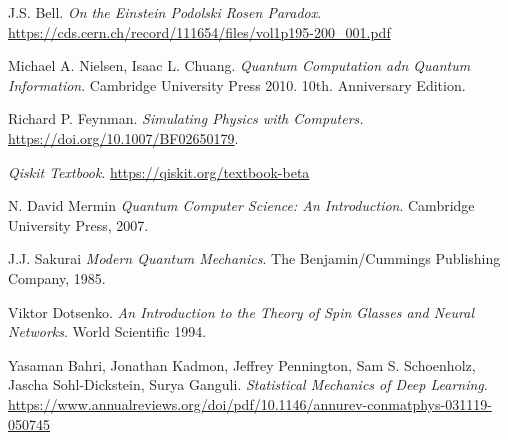 \documentclass[a4paper]{article}
\begin{document}
\begin{thebibliography}{99}

 J.S. Bell. \textit{On the Einstein Podolski Rosen Paradox}. \url{https://cds.cern.ch/record/111654/files/vol1p195-200_001.pdf}

 Michael A. Nielsen, Isaac L. Chuang. \textit{Quantum Computation adn Quantum Information}. Cambridge University Press 2010. 10th. Anniversary Edition.

 Richard P. Feynman. \textit{Simulating Physics with Computers.} \url{https://doi.org/10.1007/BF02650179}.

 \textit{Qiskit Textbook}. \url{https://qiskit.org/textbook-beta}

 N. David Mermin \textit{Quantum Computer Science: An Introduction}. Cambridge University Press, 2007.

 J.J. Sakurai \textit{Modern Quantum Mechanics}. The Benjamin/Cummings Publishing Company, 1985.

 Viktor Dotsenko. \textit{An Introduction to the Theory of Spin Glasses and Neural Networks}. World Scientific 1994.

 Yasaman Bahri, Jonathan Kadmon, Jeffrey Pennington, Sam S. Schoenholz, Jascha Sohl-Dickstein, Surya Ganguli. \textit{Statistical Mechanics of Deep Learning}. \url{https://www.annualreviews.org/doi/pdf/10.1146/annurev-conmatphys-031119-050745}


\end{thebibliography}
\end{document}
